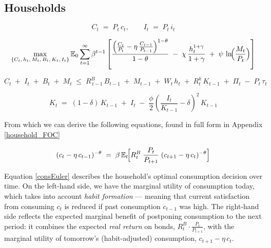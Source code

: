 \documentclass[11pt,preprint]{elsarticle}
\numberwithin{equation}{section}
\numberwithin{figure}{section}
\numberwithin{table}{section}
\begin{document}
\subsection{Households}\label{households}

\begin{equation}
C_t \;=\; P_t \, c_t,
\qquad
I_t \;=\; P_t \, i_t
\label{nominal_definitions}
\end{equation}

\begin{equation}
\max_{\{C_t,\,h_t,\,M_t,\,B_t,\,K_t,\,I_t\}}
\mathbb{E}_0 \sum_{t=1}^{\infty} \beta^{t-1}
\left[
\frac{\Bigl(\frac{C_t}{P_t} - \eta\,\frac{C_{t-1}}{P_{t-1}}\Bigr)^{1-\theta}}{1-\theta}
\;-\;\chi\,\frac{h_t^{1+\gamma}}{1+\gamma}
\;+\;\psi\,\ln\!\Bigl(\frac{M_t}{P_t}\Bigr)
\right]
\label{lifetime_utility_nominal}
\end{equation}

\begin{equation}
C_t \;+\; I_t \;+\; B_t \;+\; M_t
\;\le\;
R^B_{\,t-1}\,B_{t-1}
\;+\; M_{t-1}
\;+\; W_t\,h_t
\;+\; R^k_t\,K_{t-1}
\;+\; \Pi_t
\;-\; P_t\,\tau_t
\label{flow_constraint_nominal}
\end{equation}

\begin{equation}
K_t
\;=\;
(1 - \delta)\,K_{t-1}
\;+\; I_t
\;-\;\frac{\phi}{2}
\left(\frac{I_t}{K_{t-1}} - \delta\right)^{2}
\,K_{t-1}
\label{capital_accumulation_nominal}
\end{equation}

From which we can derive the following equations, found in full form in
Appendix \ref{household_FOC}

\begin{equation}\label{consEuler}
  (c_t - \eta\,c_{t-1})^{-\theta}
  \;=\;
  \beta\,\mathbb{E}_t\!\Bigl[
    R_t^B \;\frac{P_t}{P_{t+1}}\;(c_{t+1} - \eta\,c_t)^{-\theta}
  \Bigr]
\end{equation}

Equation \ref{consEuler} describes the household's optimal consumption
decision over time. On the left-hand side, we have the marginal utility
of consumption today, which takes into account \emph{habit formation}
--- meaning that current satisfaction from consuming \(c_t\) is reduced
if past consumption \(c_{t-1}\) was high. The right-hand side reflects
the expected marginal benefit of postponing consumption to the next
period: it combines the expected \emph{real return} on bonds,
\(R_t^B \cdot \frac{P_t}{P_{t+1}}\), with the marginal utility of
tomorrow's (habit-adjusted) consumption, \(c_{t+1} - \eta\,c_t\).
\end{document}

